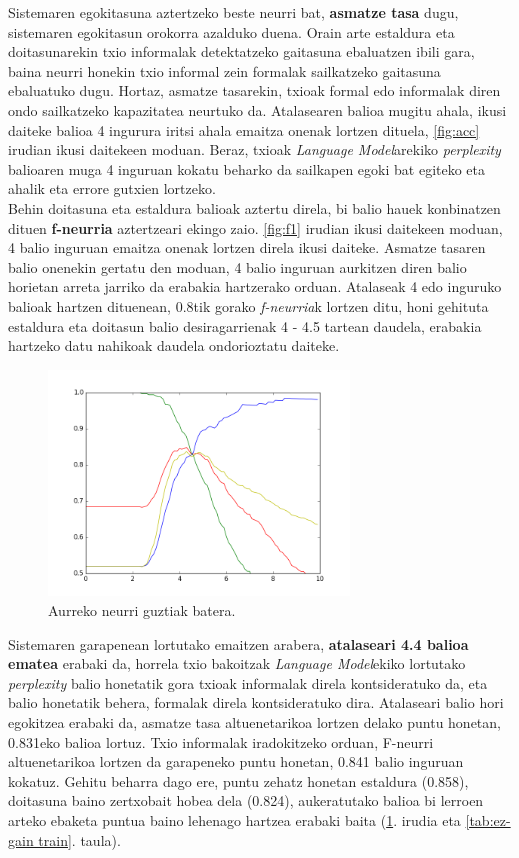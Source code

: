 \documentclass[information,article,submit,moreauthors,pdftex,10pt,a4paper]{Definitions/mdpi}
\begin{document}
Sistemaren egokitasuna aztertzeko beste neurri bat, \textbf{asmatze tasa} dugu, sistemaren egokitasun orokorra azalduko duena. Orain arte estaldura eta doitasunarekin txio informalak detektatzeko gaitasuna ebaluatzen ibili gara, baina neurri honekin txio informal zein formalak sailkatzeko gaitasuna ebaluatuko dugu. Hortaz, asmatze tasarekin, txioak formal edo informalak diren ondo sailkatzeko kapazitatea neurtuko da. Atalasearen balioa mugitu ahala, ikusi daiteke balioa 4 ingurura iritsi ahala emaitza onenak lortzen dituela, \ref{fig:acc} irudian ikusi daitekeen moduan. Beraz, txioak \textit{Language Model}arekiko \textit{perplexity} balioaren muga 4 inguruan kokatu beharko da sailkapen egoki bat egiteko eta ahalik eta errore gutxien lortzeko.\\
\indent Behin doitasuna eta estaldura balioak aztertu direla, bi balio hauek konbinatzen dituen \textbf{f-neurria} aztertzeari ekingo zaio. \ref{fig:f1} irudian ikusi daitekeen moduan, 4 balio inguruan emaitza onenak lortzen direla ikusi daiteke. Asmatze tasaren balio onenekin gertatu den moduan, 4 balio inguruan aurkitzen diren balio horietan arreta jarriko da erabakia hartzerako orduan. Atalaseak 4 edo inguruko balioak hartzen dituenean, 0.8tik gorako \textit{f-neurria}k lortzen ditu, honi gehituta estaldura eta doitasun balio desiragarrienak 4 - 4.5 tartean daudela, erabakia hartzeko datu nahikoak daudela ondorioztatu daiteke.

\begin{figure}[H]
  \centering
  \includegraphics[height=6cm]{denaperp}
  \caption{Aurreko neurri guztiak batera.}
  \label{fig:all m}
\end{figure}

\indent Sistemaren garapenean lortutako emaitzen arabera, \textbf{atalaseari 4.4 balioa ematea} erabaki da, horrela txio bakoitzak \textit{Language Model}ekiko lortutako \textit{perplexity} balio honetatik gora txioak informalak direla kontsideratuko da, eta balio honetatik behera, formalak direla kontsideratuko dira. Atalaseari balio hori egokitzea erabaki da, asmatze tasa altuenetarikoa lortzen delako puntu honetan, 0.831eko balioa lortuz. Txio informalak iradokitzeko orduan, F-neurri altuenetarikoa lortzen da garapeneko puntu honetan, 0.841 balio inguruan kokatuz. Gehitu beharra dago ere, puntu zehatz honetan estaldura (0.858), doitasuna baino zertxobait hobea dela (0.824), aukeratutako balioa bi lerroen arteko ebaketa puntua baino lehenago hartzea erabaki baita (\ref{fig:all m}. irudia eta \ref{tab:ez-gain train}. taula).
\end{document}

